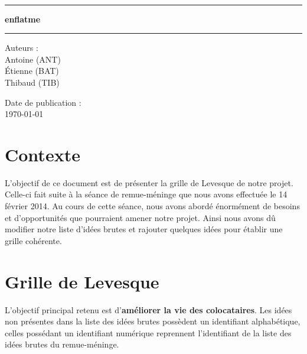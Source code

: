 \documentclass[a4paper, 12pt, french]{article}
\newcommand{\nomProjet}{enflatme\xspace}
\begin{document}
	\begin{titlepage}
		\begin{center}
			\LARGE{} \\
		    \rule{\linewidth}{1.5pt}
		    \huge{\textbf{\nomProjet}}
		    \rule{\linewidth}{1.5pt} \newline{} \newline{}
		\end{center}
		\begin{center}
		    \large{Auteurs :}\\ Antoine  (ANT)\\ Étienne  (BAT) \\ Thibaud  (TIB)
		\end{center}
		\vspace{50px}
		\begin{center}
			\large{Date de publication :}\\ \today
		\end{center}
	\end{titlepage}

  \section{Contexte}
  L'objectif de ce document est de présenter la grille de Levesque de notre projet. Celle-ci fait suite à la séance de remue-méninge que nous avons effectuée le 14 février 2014. Au cours de cette séance, nous avons abordé énormément de besoins et d'opportunités que pourraient amener notre projet. Ainsi nous avons dû modifier notre liste  d'idées brutes et rajouter quelques idées pour établir une grille cohérente.

	\section{Grille de Levesque}
	L'objectif principal retenu est d'\textbf{améliorer la vie des colocataires}.
  Les idées non présentes dans la liste des idées brutes possèdent un identifiant alphabétique, celles possédant un identifiant numérique reprennent l'identifiant de la liste des idées brutes du remue-méninge.
\end{document}
